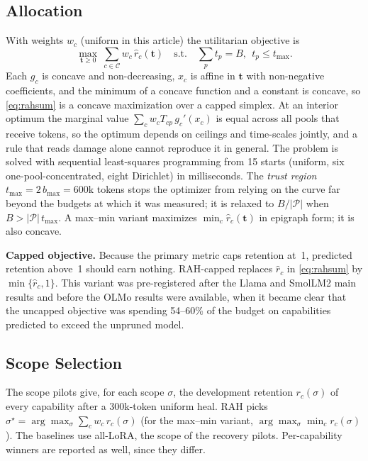 \documentclass{ieeeaccess}
\newcommand{\caps}{\mathcal{C}}
\newcommand{\pools}{\mathcal{P}}
\newcommand{\tvec}{\mathbf{t}}
\newcommand{\RAH}{RAH}
\begin{document}
\subsection{Allocation}
With weights $w_c$ (uniform in this article) the utilitarian objective is
\begin{equation}
\max_{\tvec\ge 0}\ \sum_{c\in\caps} w_c\,\hat r_c(\tvec)\quad\text{s.t.}\quad \sum_{p}t_p = B,\ \ t_p \le t_{\max}.
\label{eq:rahsum}
\end{equation}
Each $g_c$ is concave and non-decreasing, $x_c$ is affine in $\tvec$ with non-negative coefficients, and the minimum of a concave function and a constant is concave, so \eqref{eq:rahsum} is a concave maximization over a capped simplex. At an interior optimum the marginal value $\sum_c w_c T_{cp}\, g_c'(x_c)$ is equal across all pools that receive tokens, so the optimum depends on ceilings and time-scales jointly, and a rule that reads damage alone cannot reproduce it in general. The problem is solved with sequential least-squares programming from 15 starts (uniform, six one-pool-concentrated, eight Dirichlet) in milliseconds. The \emph{trust region} $t_{\max} = 2\,b_{\max} = 600\mathrm{k}$ tokens stops the optimizer from relying on the curve far beyond the budgets at which it was measured; it is relaxed to $B/|\pools|$ when $B > |\pools|\,t_{\max}$. A max--min variant maximizes $\min_c \hat r_c(\tvec)$ in epigraph form; it is also concave.

\textbf{Capped objective.} Because the primary metric caps retention at~1, predicted retention above~1 should earn nothing. \RAH-capped replaces $\hat r_c$ in \eqref{eq:rahsum} by $\min\{\hat r_c,1\}$. This variant was pre-registered after the Llama and SmolLM2 main results and before the OLMo results were available, when it became clear that the uncapped objective was spending 54--60\% of the budget on capabilities predicted to exceed the unpruned model.

\subsection{Scope Selection}
The scope pilots give, for each scope $\sigma$, the development retention $r_c(\sigma)$ of every capability after a 300k-token uniform heal. \RAH{} picks $\sigma^\star = \arg\max_\sigma \sum_c w_c\, r_c(\sigma)$ (for the max--min variant, $\arg\max_\sigma \min_c r_c(\sigma)$). The baselines use all-LoRA, the scope of the recovery pilots. Per-capability winners are reported as well, since they differ.
\end{document}
